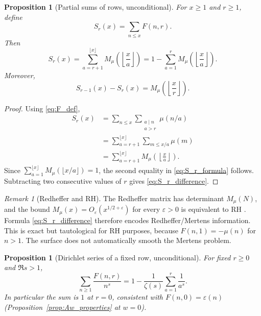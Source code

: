 \documentclass[11pt]{amsart}
\numberwithin{equation}{section}
\theoremstyle{plain}
\newtheorem{proposition}[theorem]{Proposition}
\theoremstyle{definition}
\theoremstyle{remark}
\newtheorem{remark}[theorem]{Remark}
\newcommand{\epsfun}{\varepsilon}
\newcommand{\mob}{\mu}
\newcommand{\zetaR}{\zeta}
\newcommand{\Fsurf}{F}
\begin{document}
\begin{proposition}[Partial sums of rows, unconditional]
\label{prop:partial_sums}
For \(x\ge1\) and \(r\ge1\), define
\begin{equation}
S_r(x)=\sum_{n\le x}\Fsurf(n,r).
\label{eq:S_r_def}
\end{equation}
Then
\begin{equation}
S_r(x)=\sum_{a=r+1}^{\lfloor x\rfloor}M_{\mob}\!\left(\left\lfloor\frac{x}{a}\right\rfloor\right)
=1-\sum_{a=1}^{r}M_{\mob}\!\left(\left\lfloor\frac{x}{a}\right\rfloor\right).
\label{eq:S_r_formula}
\end{equation}
Moreover,
\begin{equation}
S_{r-1}(x)-S_r(x)=M_{\mob}\!\left(\left\lfloor\frac{x}{r}\right\rfloor\right).
\label{eq:S_r_difference}
\end{equation}
\end{proposition}

\begin{proof}
Using \eqref{eq:F_def},
\begin{align}
S_r(x)
&=\sum_{n\le x}\sum_{\substack{a\mid n\\a>r}}\mob(n/a) \\
&=\sum_{a=r+1}^{\lfloor x\rfloor}\sum_{m\le x/a}\mob(m) \\
&=\sum_{a=r+1}^{\lfloor x\rfloor}M_{\mob}\!\left(\left\lfloor\frac{x}{a}\right\rfloor\right).
\label{eq:S_r_proof_first}
\end{align}
Since \(\sum_{a=1}^{\lfloor x\rfloor}M_{\mob}(\lfloor x/a\rfloor)=1\), the second equality in \eqref{eq:S_r_formula} follows.  Subtracting two consecutive values of \(r\) gives \eqref{eq:S_r_difference}.
\end{proof}

\begin{remark}[Redheffer and RH]
\label{rem:redheffer_RH}
The Redheffer matrix has determinant \(M_{\mob}(N)\), and the bound \(M_{\mob}(x)=O_\varepsilon(x^{1/2+\varepsilon})\) for every \(\varepsilon>0\) is equivalent to RH \cite{Redheffer1977,Titchmarsh1986}.  Formula \eqref{eq:S_r_difference} therefore encodes Redheffer/Mertens information.  This is exact but tautological for RH purposes, because \(\Fsurf(n,1)=-\mob(n)\) for \(n>1\).  The surface does not automatically smooth the Mertens problem.
\end{remark}

\begin{proposition}[Dirichlet series of a fixed row, unconditional]
\label{prop:row_dirichlet_series}
For fixed \(r\ge0\) and \(\Re s>1\),
\begin{equation}
\sum_{n\ge1}\frac{\Fsurf(n,r)}{n^s}=1-\frac1{\zetaR(s)}\sum_{a=1}^r\frac1{a^s}.
\label{eq:row_dirichlet_series}
\end{equation}
In particular the sum is \(1\) at \(r=0\), consistent with \(\Fsurf(n,0)=\epsfun(n)\) (Proposition~\ref{prop:Aw_properties} at \(w=0\)).
\end{proposition}
\end{document}
